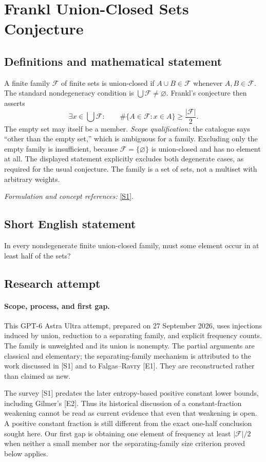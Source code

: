\documentclass[11pt]{article}
\begin{document}
\section*{\texorpdfstring{Frankl Union-Closed Sets Conjecture}{Frankl Union-Closed Sets Conjecture}}\label{411}
\subsection{Definitions and mathematical statement}
A finite family $\mathcal F$ of finite sets is union-closed if $A\cup B\in\mathcal F$ whenever $A,B\in\mathcal F$. The standard nondegeneracy condition is $\bigcup\mathcal F\ne\varnothing$. Frankl's conjecture then asserts
\[
 \exists x\in\bigcup\mathcal F:\qquad
 \#\{A\in\mathcal F:x\in A\}\ge\frac{|\mathcal F|}{2}.
\]
The empty set may itself be a member. \emph{Scope qualification:} the catalogue says ``other than the empty set,'' which is ambiguous for a family. Excluding only the empty family is insufficient, because $\mathcal F=\{\varnothing\}$ is union-closed and has no element at all. The displayed statement explicitly excludes both degenerate cases, as required for the usual conjecture. The family is a set of sets, not a multiset with arbitrary weights.
\par\smallskip\textit{Formulation and concept references:} \href{https://arxiv.org/pdf/1309.3297}{[S1]}.

\subsection{Short English statement}
In every nondegenerate finite union-closed family, must some element occur in at least half of the sets?
\subsection{Research attempt}
\paragraph{Scope, process, and first gap.}
This GPT-6 Astra Ultra attempt, prepared on 27 September 2026, uses injections induced by union, reduction to a separating family, and explicit frequency counts. The family is unweighted and its union is nonempty. The partial arguments are classical and elementary; the separating-family mechanism is attributed to the work discussed in [S1] and to Falgas--Ravry [E1]. They are reconstructed rather than claimed as new.

The survey [S1] predates the later entropy-based positive constant lower bounds, including Gilmer's [E2]. Thus its historical discussion of a constant-fraction weakening cannot be read as current evidence that even that weakening is open. A positive constant fraction is still different from the exact one-half conclusion sought here. Our first gap is obtaining one element of frequency at least $|\mathcal F|/2$ when neither a small member nor the separating-family size criterion proved below applies.
\end{document}
